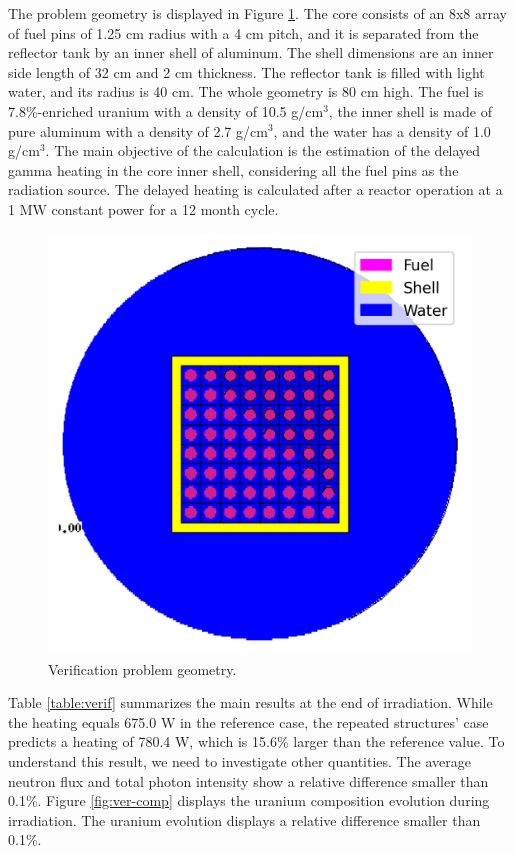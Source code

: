 The problem geometry is displayed in Figure \ref{fig:toy-geo2}.
The core consists of an 8x8 array of fuel pins of 1.25 cm radius with a 4 cm pitch, and it is separated from the reflector tank by an inner shell of aluminum.
The shell dimensions are an inner side length of 32 cm and 2 cm thickness.
The reflector tank is filled with light water, and its radius is 40 cm.
The whole geometry is 80 cm high.
The fuel is 7.8\%-enriched uranium with a density of 10.5 g/cm$^3$, the inner shell is made of pure aluminum with a density of 2.7 g/cm$^3$, and the water has a density of 1.0 g/cm$^3$.
The main objective of the calculation is the estimation of the delayed gamma heating in the core inner shell, considering all the fuel pins as the radiation source.
The delayed heating is calculated after a reactor operation at a 1 MW constant power for a 12 month cycle.

\begin{figure}[htbp!] %
    \centering
    \includegraphics[width=0.6\linewidth]{figures/toy-problem-b.png}
    \hfill
    \caption{Verification problem geometry.}
    \label{fig:toy-geo2}
\end{figure}


Table \ref{table:verif} summarizes the main results at the end of irradiation.
While the heating equals 675.0 W in the reference case, the repeated structures' case predicts a heating of 780.4 W, which is 15.6\% larger than the reference value.
To understand this result, we need to investigate other quantities.
The average neutron flux and total photon intensity show a relative difference smaller than 0.1\%.
Figure \ref{fig:ver-comp} displays the uranium composition evolution during irradiation.
The uranium evolution displays a relative difference smaller than 0.1\%.

